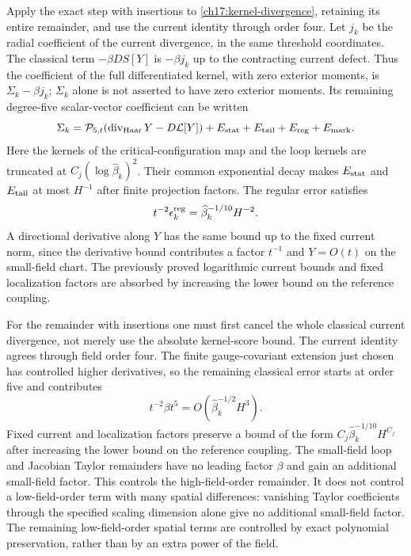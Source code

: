 Apply the exact step with insertions to \eqref{ch17:kernel-divergence}, retaining
its entire remainder, and use the current identity through order four.
Let $j_k$ be the radial coefficient of the current divergence, in the
same threshold coordinates. The classical term $-\beta DS[Y]$ is
$-\beta j_k$ up to the contracting current defect. Thus the coefficient
of the full differentiated kernel, with zero exterior moments, is $\Sigma_k-\beta j_k$;
$\Sigma_k$ alone is not asserted to have zero exterior moments. Its
remaining degree-five scalar-vector coefficient can be written
\begin{equation}\label{ch17:finite-sigma}
 \Sigma_k=\mathcal P_{5,t}
       (\operatorname{div}_{\rm Haar}Y-D\mathcal L[Y])
       +E_{\rm stat}+E_{\rm tail}+E_{\rm reg}+E_{\rm mark}.
\end{equation}
Here the kernels of the critical-configuration map and the loop kernels are truncated at
$C_j(\log\widehat\beta_k)^2$. Their common exponential decay makes
$E_{\rm stat}$ and $E_{\rm tail}$ at most $H^{-1}$ after finite
projection factors. The regular error satisfies
\[
 t^{-2}\epsilon_k^{\rm reg}
       =\widehat\beta_k^{-1/10}H^{-2}.
\]
A directional derivative along $Y$ has the same bound up to the fixed
current norm, since the derivative bound contributes a factor $t^{-1}$
and $Y=O(t)$ on the small-field chart. The previously proved logarithmic current bounds
and fixed localization factors are absorbed by increasing the lower bound on the reference coupling.

For the remainder with insertions one must first cancel the whole classical
current divergence, not merely use the absolute kernel-score bound.
The current identity agrees through field order four. The finite
gauge-covariant extension just chosen has controlled higher derivatives,
so the remaining classical error starts at order five and contributes
\[
 t^{-2}\beta t^5=O(\widehat\beta_k^{-1/2}H^3).
\]
Fixed current and localization factors preserve a bound of the form
$C_j\widehat\beta_k^{-1/10}H^{C_j}$ after increasing the lower bound on the reference coupling. The small-field loop
and Jacobian Taylor remainders have no leading factor $\beta$ and
gain an additional small-field factor. This controls the high-field-order remainder. It does not control a
low-field-order term with many spatial differences: vanishing Taylor coefficients through the specified scaling dimension alone give no additional small-field factor. The remaining low-field-order spatial terms are controlled by exact
polynomial preservation, rather than by an extra power of the field.


